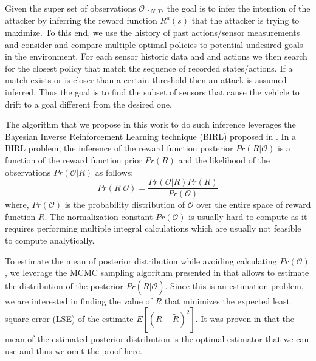 \documentclass[letterpaper, 10 pt, conference]{ieeeconf}  %
\begin{document}
Given the super set of observations $\mathcal{\mathcal{O}}_{1:N,T}$, the goal is to infer the intention of the attacker by inferring the reward function $R^a (s)$ that the attacker is trying to maximize. To this end, we use the history of past actions/sensor measurements and consider and compare multiple optimal policies to potential undesired goals in the environment. For each sensor historic data and and actions we then search for the closest policy that match the sequence of recorded states/actions. If a match exists or is closer than a certain threshold then an attack is assumed inferred. Thus the goal is to find the subset of sensors that cause the vehicle to drift to a goal different from the desired one.




The algorithm that we propose in this work to do such inference leverages the Bayesian Inverse Reinforcement Learning technique (BIRL) proposed in \cite{Ramachandran2007}. In a BIRL problem, the inference of the reward function posterior $Pr(R|\mathcal{O})$ is a function of the reward function prior $Pr(R)$ and the likelihood of the observations $Pr(\mathcal{O}|R)$ as follows:
\begin{equation} 
    Pr(R|\mathcal{O}) = \frac{Pr(\mathcal{O}|R)Pr(R)}{Pr(\mathcal{O})}
\end{equation}
where, $Pr(\mathcal{O})$ is the probability distribution of $\mathcal{O}$ over the entire space of reward function $R$. The normalization constant $Pr(\mathcal{O})$ is usually hard to compute as it requires performing multiple integral calculations which are usually not feasible to compute analytically. 

To estimate the mean of posterior distribution while avoiding calculating $Pr(\mathcal{O})$, we leverage the MCMC sampling algorithm presented in \cite{andrieu2003introduction} that allows to estimate the distribution of the posterior $Pr(\tilde{R}|\mathcal{O})$. Since this is an estimation problem, we are interested in finding the value of $R$ that minimizes the expected least square error (LSE) of the estimate $E[(R-\tilde{R})^2]$. It was proven in \cite{Ramachandran2007} that the mean of the estimated posterior distribution is the optimal estimator that we can use and thus we omit the proof here.
\end{document}
